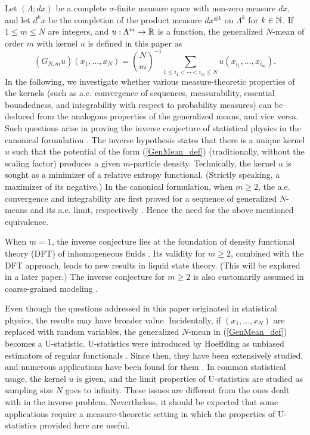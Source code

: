 \documentclass[12pt,leqno]{amsart}
\numberwithin{equation}{section}
\numberwithin{theor}{section}
\numberwithin{rem}{section}
\begin{document}
 
Let $(\Lambda; dx)$ be a complete $\sigma $-finite measure space with non-zero measure $dx$, and let  
$d^{k}x$ be the completion of the product measure 
$dx^{\otimes k}$ on $\Lambda^{k}$ for $k\in\Bbb{N}$.  
If $1\leq m\leq N$ are integers, and $u:\Lambda^{m}\rightarrow \Bbb{R}$ is a function, the generalized 
$N$-mean of order $m$ with kernel $u$ is defined in this paper as  
\begin{equation}
\label{GenMean_def}
\left(G_{N,m}u\right)(x_1,...,x_N)=
{\binom{N}{m}}^{-1}
\sum_{1\leq i_{1}<\cdots <i_{m}\leq N}
u(x_{i_{1}},...,x_{i_{m}}).  
\end{equation}
In the following, we investigate whether various measure-theoretic properties of the kernels (such as a.e. convergence of sequences, measurability, essential boundedness, and integrability with respect to probability 
measures) can be deduced from the analogous properties 
of the generalized means, and vice versa.  
Such questions arise in proving the inverse conjecture of statistical physics in the canonical formulation \cite{ChChLi84,Navr15}.  The inverse hypothesis states that 
there is a unique kernel $u$ such that the potential of the form (\ref{GenMean_def}) (traditionally, without the scaling factor) produces a given $m$-particle density.  Technically, the kernel $u$ is sought as a minimizer of 
a relative entropy functional.  
(Strictly speaking, a maximizer of its negative.)  In the canonical formulation, when $m\geq 2$, the a.e. convergence and integrability are first proved for a sequence 
of generalized $N$-means and its a.e. limit, respectively \cite{Navr15}.  Hence the need for the above mentioned equivalence. 

When $m=1$, the inverse conjecture lies at the foundation of density functional theory (DFT) of  inhomogeneous fluids \cite{Evans79}.  Its validity for $m\geq 2$, combined with the DFT approach,  leads to new results in liquid state theory. (This will be explored in a later paper.)  The inverse conjecture for $m\geq 2$ is also customarily assumed in coarse-grained modeling \cite{Noid13,LyLa95}.  
  
Even though the questions addressed in this paper originated in statistical physics, the results may have broader value.  Incidentally, if 
$(x_1,...,x_N)$ are replaced  with random variables, the generalized $N$-mean in (\ref{GenMean_def}) becomes a U-statistic.  U-statistics were introduced by Hoeffding as unbiased estimators of regular functionals \cite{Hoeffding48}.  Since then, they have been extensively 
studied, and numerous applications have been found for them \cite{Koroljuk94, Lee90}.  In common statistical usage, the kernel $u$ is given, and the limit properties of U-statistics are studied as sampling size $N$ goes to infinity.  These issues are different from the ones dealt with in the inverse problem.  Nevertheless, it should be expected that some applications require a measure-theoretic setting in which the properties of U-statistics provided here are useful.   
\end{document}
